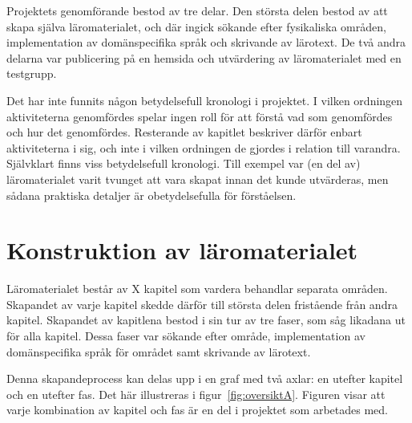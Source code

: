 \begin{draft}

Projektets genomförande bestod av tre delar. Den största delen bestod av att skapa själva läromaterialet, och där ingick sökande efter fysikaliska områden, implementation av domänspecifika språk och skrivande av lärotext. De två andra delarna var publicering på en hemsida och utvärdering av läromaterialet med en testgrupp.

Det har inte funnits någon betydelsefull kronologi i projektet. I vilken ordningen aktiviteterna genomfördes spelar ingen roll för att förstå vad som genomfördes och hur det genomfördes. Resterande av kapitlet beskriver därför enbart aktiviteterna i sig, och inte i vilken ordningen de gjordes i relation till varandra. Självklart finns viss betydelsefull kronologi. Till exempel var (en del av) läromaterialet varit tvunget att vara skapat innan det kunde utvärderas, men sådana praktiska detaljer är obetydelsefulla för förståelsen.

\section{Konstruktion av läromaterialet}

Läromaterialet består av X kapitel som vardera behandlar separata
områden. Skapandet av varje kapitel skedde därför till största delen fristående
från andra kapitel. Skapandet av kapitlena bestod i sin tur av tre faser,
som såg likadana ut för alla kapitel. Dessa faser var sökande efter område,
implementation av domänspecifika språk för området samt skrivande av lärotext.

Denna skapandeprocess kan delas upp i en graf med två axlar: en utefter kapitel och en
utefter fas. Det här illustreras i figur~\ref{fig:oversiktA}. Figuren visar att
varje kombination av kapitel och fas är en del i projektet som arbetades med.


\end{draft}
